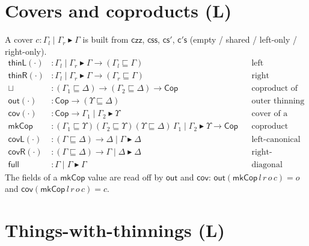\documentclass{article}
\newcommand{\thin}{\sqsubseteq}                    %
\newcommand{\Cover}[3]{#1 \mid #2 \blacktriangleright #3}
\newcommand{\thL}{\mathsf{thinL}}
\newcommand{\thR}{\mathsf{thinR}}
\newcommand{\cop}{\mathbin{\sqcup}}                 %
\newcommand{\mkcop}{\mathsf{mkCop}}
\newcommand{\out}{\mathsf{out}}
\newcommand{\cov}{\mathsf{cov}}
\newcommand{\covL}{\mathsf{covL}}
\newcommand{\covR}{\mathsf{covR}}
\newcommand{\full}{\mathsf{full}}
\newcommand{\catL}{\textbf{(L)}}
\theoremstyle{plain}
\begin{document}
\section{Covers and coproducts \hfill \catL}\label{sig:cover}

A cover $c : \Cover{\Gamma_l}{\Gamma_r}{\Gamma}$ is built from
$\mathsf{czz}$, $\mathsf{css}$, $\mathsf{cs'}$, $\mathsf{c's}$
(empty / shared / left-only / right-only).
\begin{align*}
  \thL(\cdot) &: \Cover{\Gamma_l}{\Gamma_r}{\Gamma} \to (\Gamma_l\thin\Gamma)
    && \text{left embedding of a cover}\\
  \thR(\cdot) &: \Cover{\Gamma_l}{\Gamma_r}{\Gamma} \to (\Gamma_r\thin\Gamma)
    && \text{right embedding}\\
  \cop        &: (\Gamma_1\thin\Delta)\to(\Gamma_2\thin\Delta)\to\mathsf{Cop}
    && \text{coproduct of two thinnings}\\
  \out(\cdot) &: \mathsf{Cop} \to (\Upsilon\thin\Delta)
    && \text{outer thinning of a coproduct}\\
  \cov(\cdot) &: \mathsf{Cop} \to \Cover{\Gamma_1}{\Gamma_2}{\Upsilon}
    && \text{cover of a coproduct}\\
  \mkcop      &: (\Gamma_1\thin\Upsilon)(\Gamma_2\thin\Upsilon)(\Upsilon\thin\Delta)\,\Cover{\Gamma_1}{\Gamma_2}{\Upsilon}\to\mathsf{Cop}
    && \text{coproduct constructor}\\
  \covL(\cdot)&: (\Gamma\thin\Delta)\to\Cover{\Delta}{\Gamma}{\Delta}
    && \text{left-canonical cover}\\
  \covR(\cdot)&: (\Gamma\thin\Delta)\to\Cover{\Gamma}{\Delta}{\Delta}
    && \text{right-canonical cover}\\
  \full       &: \Cover{\Gamma}{\Gamma}{\Gamma}
    && \text{diagonal cover}
\end{align*}
The fields of a $\mkcop$ value are read off by $\out$ and $\cov$:
$\out(\mkcop\,l\,r\,o\,c) = o$ and $\cov(\mkcop\,l\,r\,o\,c) = c$.

\section{Things-with-thinnings \hfill \catL}\label{sig:scaffold}
\end{document}
